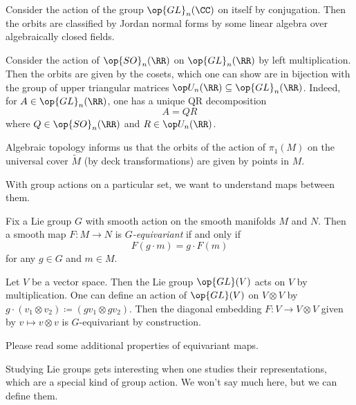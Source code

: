 \documentclass[../notes.tex]{subfiles}
\begin{document}
\begin{example}
	Consider the action of the group $\op{GL}_n(\CC)$ on itself by conjugation. Then the orbits are classified by Jordan normal forms by some linear algebra over algebraically closed fields.
\end{example}
\begin{example}
	Consider the action of $\op{SO}_n(\RR)$ on $\op{GL}_n(\RR)$ by left multiplication. Then the orbits are given by the cosets, which one can show are in bijection with the group of upper triangular matrices $\op U_n(\RR)\subseteq\op{GL}_n(\RR)$. Indeed, for $A\in\op{GL}_n(\RR)$, one has a unique QR decomposition
	\[A=QR\]
	where $Q\in\op{SO}_n(\RR)$ and $R\in\op U_n(\RR)$.
\end{example}
\begin{example}
	Algebraic topology informs us that the orbits of the action of $\pi_1(M)$ on the universal cover $\widetilde M$ (by deck transformations) are given by points in $M$.
\end{example}
With group actions on a particular set, we want to understand maps between them.
\begin{definition}[equivariant]
	Fix a Lie group $G$ with smooth action on the smooth manifolds $M$ and $N$. Then a smooth map $F\colon M\to N$ is \textit{$G$-equivariant} if and only if
	\[F(g\cdot m)=g\cdot F(m)\]
	for any $g\in G$ and $m\in M$.
\end{definition}
\begin{example}
	Let $V$ be a vector space. Then the Lie group $\op{GL}(V)$ acts on $V$ by multiplication. One can define an action of $\op{GL}(V)$ on $V\otimes V$ by $g\cdot(v_1\otimes v_2)\coloneqq(gv_1\otimes gv_2)$. Then the diagonal embedding $F\colon V\to V\otimes V$ given by $v\mapsto v\otimes v$ is $G$-equivariant by construction.
\end{example}
\begin{remark}
	Please read some additional properties of equivariant maps.
\end{remark}
Studying Lie groups gets interesting when one studies their representations, which are a special kind of group action. We won't say much here, but we can define them.
\end{document}
